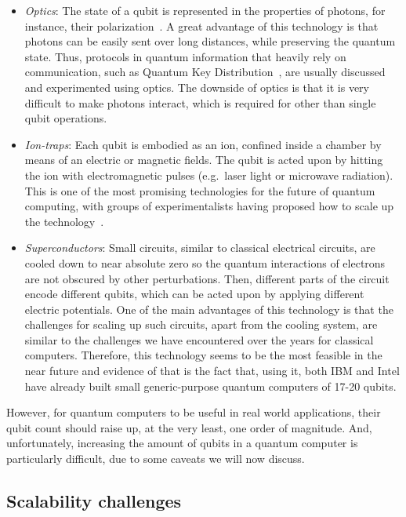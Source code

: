 \begin{itemize}

  \item \textit{Optics}: The state of a qubit is represented in the properties of photons, for instance, their polarization~\citep{OpticsQC}. A great advantage of this technology is that photons can be easily sent over long distances, while preserving the quantum state. Thus, protocols in quantum information that heavily rely on communication, such as Quantum Key Distribution~\citep{QKD}, are usually discussed and experimented using optics. The downside of optics is that it is very difficult to make photons interact, which is required for other than single qubit operations.

  \item \textit{Ion-traps}: Each qubit is embodied as an ion, confined inside a chamber by means of an electric or magnetic fields. The qubit is acted upon by hitting the ion with electromagnetic pulses (e.g.\ laser light or microwave radiation). This is one of the most promising technologies for the future of quantum computing, with groups of experimentalists having proposed how to scale up the technology~\citep{HensingerIonTraps}.

  \item \textit{Superconductors}: Small circuits, similar to classical electrical circuits, are cooled down to near absolute zero so the quantum interactions of electrons are not obscured by other perturbations. Then, different parts of the circuit encode different qubits, which can be acted upon by applying different electric potentials. One of the main advantages of this technology is that the challenges for scaling up such circuits, apart from the cooling system, are similar to the challenges we have encountered over the years for classical computers. Therefore, this technology seems to be the most feasible in the near future and evidence of that is the fact that, using it, both IBM and Intel have already built small generic-purpose quantum computers of 17-20 qubits.

\end{itemize}

However, for quantum computers to be useful in real world applications, their qubit count should raise up, at the very least, one order of magnitude. And, unfortunately, increasing the amount of qubits in a quantum computer is particularly difficult, due to some caveats we will now discuss.


\subsection{Scalability challenges}
\label{Challenges}

